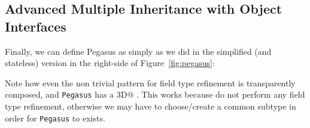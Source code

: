 \subsection{Advanced Multiple Inheritance with Object Interfaces}
Finally, we can define Pegasus as simply as we did in the simplified (and stateless) 
version in the right-side of Figure~\ref{fig:pegasus}:


\noindent Note how even the non trivial pattern for field type refinement is
transparently composed, and \texttt{Pegasus} has a \Q@Point3D@
\Q@location@. This works because \Q@Horse@ do not perform
any field type refinement, otherwise we may have to choose/create a
common subtype in order for \texttt{Pegasus} to exists.

